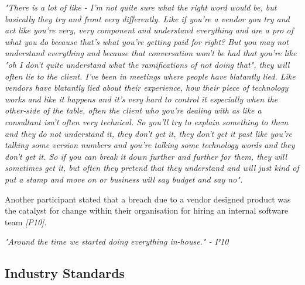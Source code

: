\textit{"There is a lot of like - I'm not quite sure what the right word would be, but basically they try and front very differently. Like if you're a vendor you try and act like you're very, very component and understand everything and are a pro of what you do because that's what you're getting paid for right? But you may not understand everything and because that conversation won't be had that you're like "oh I don't quite understand what the ramifications of not doing that", they will often lie to the client. I've been in meetings where people have blatantly lied. Like vendors have blatantly lied about their experience, how their piece of technology works and like it happens and it's very hard to control it especially when the other-side of the table, often the client who you're dealing with as like a consultant isn't often very technical. So you'll try to explain something to them and they do not understand it, they don't get it, they don't get it past like you're talking some version numbers and you're talking some technology words and they don't get it. So if you can break it down further and further for them, they will sometimes get it, but often they pretend that they understand and will just kind of put a stamp and move on or business will say budget and say no".}
\newline
\par
Another participant stated that a breach due to a vendor designed product was the catalyst for change within their organisation for hiring an internal software team \textit{[P10]}.
\newline
\par
\textit{"Around the time we started doing everything in-house." - P10}

\subsection{Industry Standards}

